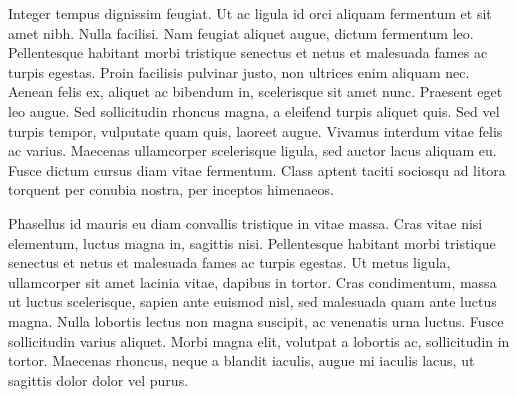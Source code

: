 Integer tempus dignissim feugiat. Ut ac ligula id orci aliquam fermentum et sit amet nibh. Nulla facilisi. Nam feugiat aliquet augue, dictum fermentum leo. Pellentesque habitant morbi tristique senectus et netus et malesuada fames ac turpis egestas. Proin facilisis pulvinar justo, non ultrices enim aliquam nec. Aenean felis ex, aliquet ac bibendum in, scelerisque sit amet nunc. Praesent eget leo augue. Sed sollicitudin rhoncus magna, a eleifend turpis aliquet quis. Sed vel turpis tempor, vulputate quam quis, laoreet augue. Vivamus interdum vitae felis ac varius. Maecenas ullamcorper scelerisque ligula, sed auctor lacus aliquam eu. Fusce dictum cursus diam vitae fermentum. Class aptent taciti sociosqu ad litora torquent per conubia nostra, per inceptos himenaeos.

Phasellus id mauris eu diam convallis tristique in vitae massa. Cras vitae nisi elementum, luctus magna in, sagittis nisi. Pellentesque habitant morbi tristique senectus et netus et malesuada fames ac turpis egestas. Ut metus ligula, ullamcorper sit amet lacinia vitae, dapibus in tortor. Cras condimentum, massa ut luctus scelerisque, sapien ante euismod nisl, sed malesuada quam ante luctus magna. Nulla lobortis lectus non magna suscipit, ac venenatis urna luctus. Fusce sollicitudin varius aliquet. Morbi magna elit, volutpat a lobortis ac, sollicitudin in tortor. Maecenas rhoncus, neque a blandit iaculis, augue mi iaculis lacus, ut sagittis dolor dolor vel purus.

